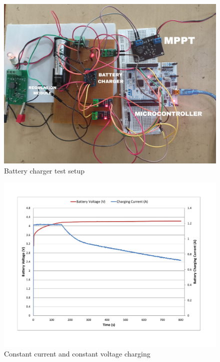 \begin{figure}[H]
	\centering
	\includegraphics[width=0.72\columnwidth]{IMGS/TestSetupPics/Bat_cha_test.jpg}
	\caption{Battery charger test setup}
	\label{fig:arch}
\end{figure}

\begin{figure}[H]
	\centering
	\includegraphics[width=0.9\columnwidth]{IMGS/Battery CC CV.pdf}
	\caption{Constant current and constant voltage charging}
	\label{fig:cccv}
\end{figure}


